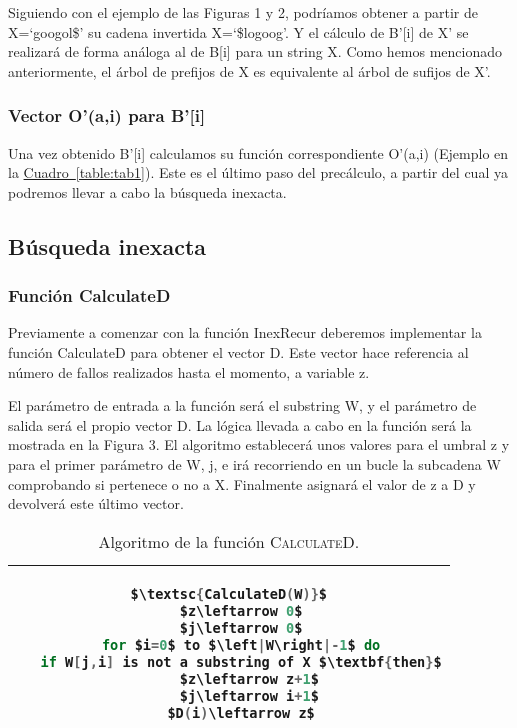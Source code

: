 \documentclass{article}
\newcommand{\tempcaption}{}
\newenvironment{codesnip}[1]{
\begin{table}[h!]
\gdef\tempcaption{#1}
\centering
\begin{tabular}{|c|}
\hline}
{\\\hline
\end{tabular}
\caption{\tempcaption}
\end{table}}
\begin{document}
Siguiendo con el ejemplo de las Figuras 1 y  2,  podríamos  obtener  a
partir de X=`googol\$’ su cadena invertida X=`\$logoog’.  Y el cálculo
de B’[i] de X’ se realizará de forma análoga al de B[i] para un string
X.  Como hemos mencionado anteriormente, el árbol de prefijos de X  es
equivalente al árbol de sufijos de X’.

\subsubsection{Vector O’(a,i) para B’[i]}

Una vez obtenido B’[i] calculamos su función correspondiente O’(a,i)
(Ejemplo en la \hyperref[table:tab1]{Cuadro~\ref*{table:tab1}}).
Este es el último paso del precálculo, a partir del cual ya podremos
llevar a cabo la búsqueda inexacta.


\subsection{Búsqueda inexacta}
\vspace{-0.25cm}
\subsubsection{Función CalculateD}
\vspace{-0.25cm}

Previamente a comenzar con la función InexRecur deberemos  implementar
la función CalculateD para obtener el  vector  D.   Este  vector  hace
referencia al número de fallos realizados hasta el momento, a variable
z.

El parámetro de entrada a  la  función	será  el  substring  W,  y  el
parámetro de salida será el propio vector D.  La lógica llevada a cabo
en la  función	será  la  mostrada  en	la  Figura  3.	 El  algoritmo
establecerá unos valores para el umbral z y para el  primer  parámetro
de W, j, e irá recorriendo en un bucle la subcadena W  comprobando  si
pertenece o no a X.  Finalmente asignará el valor de z a D y devolverá
este último vector.

\begin{codesnip}{Algoritmo de la función \textsc{CalculateD}.\cite{li_durbin_2009}}
\begin{lstlisting}[mathescape=true, language = C]
$\textsc{CalculateD(W)}$
   $z\leftarrow 0$
   $j\leftarrow 0$
   for $i=0$ to $\left|W\right|-1$ do
   if W[j,i] is not a substring of X $\textbf{then}$
     $z\leftarrow z+1$
     $j\leftarrow i+1$
   $D(i)\leftarrow z$
\end{lstlisting}
\end{codesnip}
\end{document}
